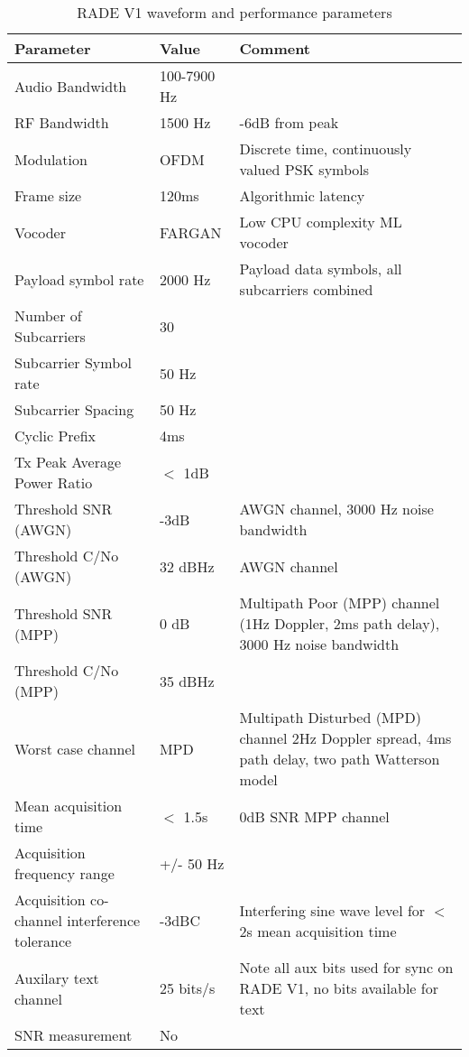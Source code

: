 \documentclass{article}
\begin{document}
\begin{table}[H]
\centering
\begin{tabular}{m{4cm} | m{2cm} | m{5cm} }
 \hline
 Parameter & Value & Comment \\
 \hline
 Audio Bandwidth & 100-7900 Hz \\
 RF Bandwidth & 1500 Hz & -6dB from peak \\
 Modulation & OFDM & Discrete time, continuously valued PSK symbols \\
 Frame size & 120ms & Algorithmic latency \\
 Vocoder & FARGAN & Low CPU complexity ML vocoder \\
 Payload symbol rate & 2000 Hz & Payload data symbols, all subcarriers combined \\
 Number of Subcarriers & 30 \\
 Subcarrier Symbol rate & 50 Hz \\
 Subcarrier Spacing & 50 Hz \\
 Cyclic Prefix & 4ms \\
 Tx Peak Average Power Ratio & $<$ 1dB \\
 Threshold SNR (AWGN) & -3dB & AWGN channel, 3000 Hz noise bandwidth \\
 Threshold C/No (AWGN) & 32 dBHz & AWGN channel \\
 Threshold SNR (MPP) & 0 dB & Multipath Poor (MPP) channel (1Hz Doppler, 2ms path delay), 3000 Hz noise bandwidth \\
 Threshold C/No  (MPP) & 35 dBHz  \\
  Worst case channel & MPD & Multipath Disturbed (MPD) channel 2Hz Doppler spread, 4ms path delay, two path Watterson model \\
 Mean acquisition time & $<$ 1.5s & 0dB SNR MPP channel \\
 Acquisition frequency range & +/- 50 Hz \\
 Acquisition co-channel interference tolerance & -3dBC & Interfering sine wave level for $<$ 2s mean acquisition time \\
 Auxilary text channel & 25 bits/s & Note all aux bits used for sync on RADE V1, no bits available for text \\
 SNR measurement & No \\
\hline
\end{tabular}
\caption{RADE V1 waveform and performance parameters}
\label{tab:constant_eb}
\end{table}
\end{document}
